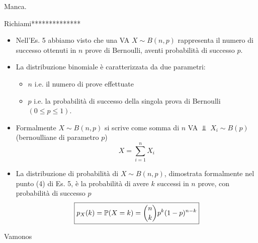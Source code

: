 Manca.
\Soluzione

Richiami**************
\begin{itemize}
\item Nell'Es. 5 abbiamo visto che una VA $X\sim B( n,p)$ rappresenta il numero di successo ottenuti in $n$ prove di Bernoulli, aventi probabilità di successo $p$.
\item La distribuzione binomiale è caratterizzata da due parametri:
\begin{itemize}
\item $n$ i.e. il numero di prove effettuate
\item $p$ i.e. la probabilità di successo della singola prova di Bernoulli $( 0\leq p\leq 1)$.
\end{itemize}
\item Formalmente $X\sim B( n,p)$ si scrive come somma di $n$ VA $\Bot $ $X_{i} \sim B( p)$ (bernoulliane di parametro $p$)\begin{equation*}
X=\sum\limits _{i=1}^{n} X_{i}
\end{equation*}
\item La distribuzione di probabilità di $X\sim B( n,p)$, dimostrata formalmente nel punto (4) di Es. 5, è la probabilità di avere $k$ successi in $n$ prove, con probabilità di successo $p$\begin{equation*}
\boxed{p_{X}( k) =\mathbb{P}( X=k) =\binom{n}{k} p^{k}( 1-p)^{n-k}}
\end{equation*}
\end{itemize}

Vamonos


